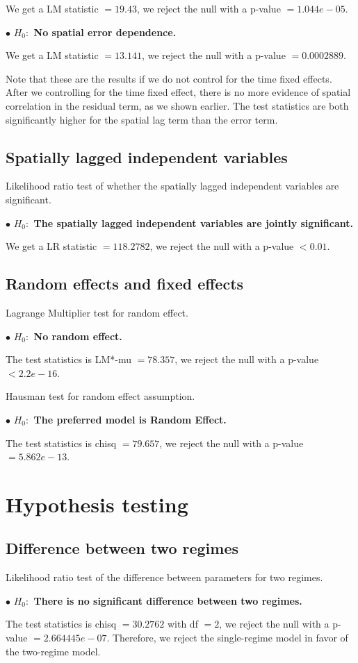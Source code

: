 \documentclass[11pt,a4paper]{amsart}
\theoremstyle{plain}
\theoremstyle{definition}
\begin{document}
We get a LM statistic $= 19.43$, we reject the null with a  p-value $= 1.044e-05$. 

$\bullet$ \textbf{$H_{0}:$ No spatial error dependence.} 

We get a LM statistic $= 13.141$, we reject the null with a  p-value $= 0.0002889$. 

Note that these are the results if we do not control for the time fixed effects. After we controlling for the time fixed effect, there is no more evidence of spatial correlation in the residual term, as we shown earlier. The test statistics are both significantly higher for the spatial lag term than the error term.

\subsection{Spatially lagged independent variables}\hfill\par

Likelihood ratio test of whether the spatially lagged independent variables are significant.

$\bullet$ \textbf{$H_{0}:$ The spatially lagged independent variables are jointly significant.} 

We get a LR statistic $= 118.2782$, we reject the null with a  p-value $< 0.01$. 

\subsection{Random effects and fixed effects}\hfill\par

Lagrange Multiplier test for random effect.

$\bullet$ \textbf{$H_{0}:$ No random effect.}

The test statistics is LM*-mu $= 78.357$, we reject the null with a p-value $< 2.2e-16$.

Hausman test for random effect assumption.

$\bullet$ \textbf{$H_{0}:$ The preferred model is Random Effect.}

The test statistics is chisq $= 79.657$, we reject the null with a p-value $= 5.862e-13$.

\section{Hypothesis testing}\hfill\par

\subsection{Difference between two regimes}\hfill\par

Likelihood ratio test of the difference between parameters for two regimes.

$\bullet$ \textbf{$H_{0}:$ There is no significant difference between two regimes.}

The test statistics is chisq $= 30.2762$ with df $= 2$, we reject the null with a p-value $= 2.664445e-07$. Therefore, we reject the single-regime model in favor of the two-regime model.


\printbibliography
\end{document}
